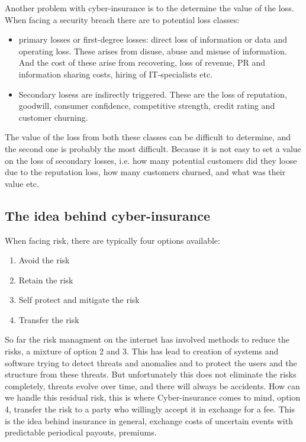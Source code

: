 Another problem with cyber-insurance is to the determine the value of the loss. When facing a security breach there are to potential loss classes:\cite{bandyopadhyay2009managers} 
\begin{itemize}
\item primary losses or first-degree losses: direct loss of information or data and operating loss. 
These arises from disuse, abuse and misuse of information.
 And the cost of these arise from recovering, loss of revenue, 
 PR and information sharing costs, hiring of IT-specialists etc.
 \item Secondary losess are indirectly triggered. These are the loss of reputation, goodwill, 
consumer confidence, competitive strength, credit rating and customer churning. 
\end{itemize}
The value of the loss from both these classes can be difficult to determine, and the second one is probably the most difficult. Because it is not easy to set a value on the loss of secondary losses, i.e. how many potential customers did they loose due to the reputation loss, how many customers churned, and what was their value etc.

\subsection{The idea behind cyber-insurance}
When facing risk, there are typically four options available:
\begin{enumerate}
\item Avoid the risk
\item Retain the risk
\item Self protect and mitigate the risk
\item Transfer the risk
\end{enumerate}
So far the risk managment on the internet has involved methods to reduce the risks, 
a mixture of option 2 and 3. This has lead to creation of systems and software trying to detect threats and anomalies and to protect the users and the structure from these threats. 
But unfortunately this does not eliminate the risks completely, threats evolve over time, 
and there will always be accidents. How can we handle this residual risk, 
this is where Cyber-insurance comes to mind, option 4, transfer the risk to a party who willingly accept it in exchange for a fee. This is the idea behind insurance in general, 
exchange costs of uncertain events with predictable periodical payouts, premiums.
\cite{bolot2008cyber}

